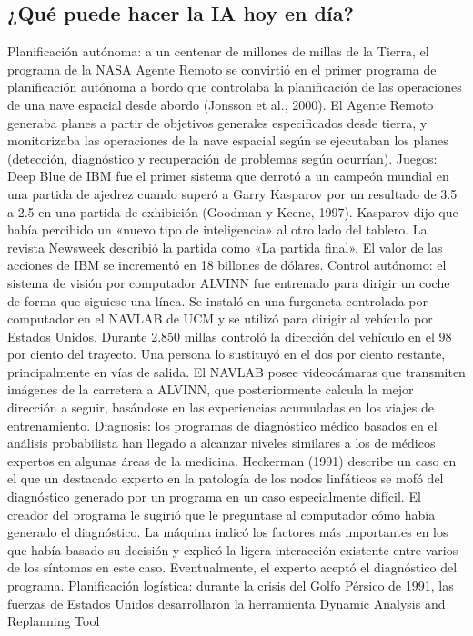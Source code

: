 \documentclass{article}
\begin{document}
\subsection{¿Qué puede hacer la IA hoy en día?}
Planificación autónoma: a un centenar de millones de millas de la Tierra, el programa de la NASA Agente Remoto se convirtió en el primer programa de planificación autónoma a bordo que controlaba la planificación de las operaciones de una nave espacial desde abordo (Jonsson et al., 2000). El Agente Remoto generaba planes a partir de objetivos generales especificados desde tierra, y monitorizaba las operaciones de la nave espacial según se ejecutaban los planes (detección, diagnóstico y recuperación de problemas según ocurrían). Juegos: Deep Blue de IBM fue el primer sistema que derrotó a un campeón mundial en una partida de ajedrez cuando superó a Garry Kasparov por un resultado de 3.5 a 2.5 en una partida de exhibición (Goodman y Keene, 1997). Kasparov dijo que había percibido un «nuevo tipo de inteligencia» al otro lado del tablero. La revista Newsweek describió la partida como «La partida final». El valor de las acciones de IBM se incrementó en 18 billones de dólares. Control autónomo: el sistema de visión por computador ALVINN fue entrenado para dirigir un coche de forma que siguiese una línea. Se instaló en una furgoneta controlada por computador en el NAVLAB de UCM y se utilizó para dirigir al vehículo por Estados Unidos. Durante 2.850 millas controló la dirección del vehículo en el 98 por ciento del trayecto. Una persona lo sustituyó en el dos por ciento restante, principalmente en vías de salida. El NAVLAB posee videocámaras que transmiten imágenes de la carretera a ALVINN, que posteriormente calcula la mejor dirección a seguir, basándose en las experiencias acumuladas en los viajes de entrenamiento. Diagnosis: los programas de diagnóstico médico basados en el análisis probabilista han llegado a alcanzar niveles similares a los de médicos expertos en algunas áreas de la medicina. Heckerman (1991) describe un caso en el que un destacado experto en la patología de los nodos linfáticos se mofó del diagnóstico generado por un programa en un caso especialmente difícil. El creador del programa le sugirió que le preguntase al computador cómo había generado el diagnóstico. La máquina indicó los factores más importantes en los que había basado su decisión y explicó la ligera interacción existente entre varios de los síntomas en este caso. Eventualmente, el experto aceptó el diagnóstico del programa. Planificación logística: durante la crisis del Golfo Pérsico de 1991, las fuerzas de Estados Unidos desarrollaron la herramienta Dynamic Analysis and Replanning Tool
\end{document}
